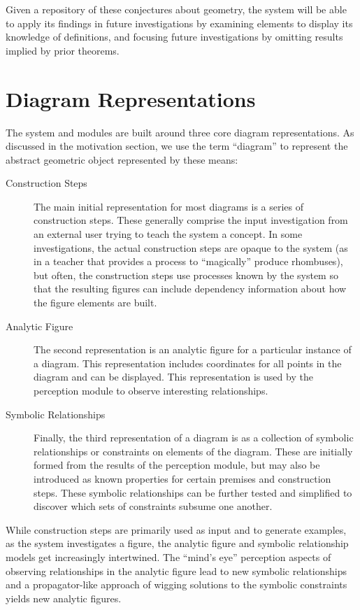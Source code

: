 Given a repository of these conjectures about geometry, the system
will be able to apply its findings in future investigations by
examining elements to display its knowledge of definitions, and
focusing future investigations by omitting results implied by prior
theorems.

\section{Diagram Representations}

The system and modules are built around three core diagram
representations. As discussed in the motivation section, we use the
term ``diagram'' to represent the abstract geometric object
represented by these means:

\begin{description}

\item[Construction Steps] The main initial representation for most
  diagrams is a series of construction steps. These generally comprise
  the input investigation from an external user trying to teach the
  system a concept. In some investigations, the actual construction
  steps are opaque to the system (as in a teacher that provides a
  process to ``magically'' produce rhombuses), but often, the
  construction steps use processes known by the system so that the
  resulting figures can include dependency information about how the
  figure elements are built.

\item[Analytic Figure] The second representation is an analytic figure
  for a particular instance of a diagram. This representation includes
  coordinates for all points in the diagram and can be displayed. This
  representation is used by the perception module to observe
  interesting relationships.

\item[Symbolic Relationships] Finally, the third representation of a
  diagram is as a collection of symbolic relationships or constraints
  on elements of the diagram. These are initially formed from the
  results of the perception module, but may also be introduced as
  known properties for certain premises and construction steps. These
  symbolic relationships can be further tested and simplified to
  discover which sets of constraints subsume one another.

\end{description}

While construction steps are primarily used as input and to generate
examples, as the system investigates a figure, the analytic figure and
symbolic relationship models get increasingly intertwined. The ``mind's
eye'' perception aspects of observing relationships in the analytic
figure lead to new symbolic relationships and a propagator-like
approach of wigging solutions to the symbolic constraints yields new
analytic figures.

